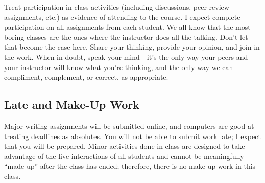 \documentclass[12pt,oneside]{amsart}	%
\begin{document}
Treat participation in class activities (including discussions, peer review assignments, etc.) as evidence of attending to the course. I expect complete participation on all assignments from each student. We all know that the most boring classes are the ones where the instructor does all the talking. Don't let that become the case here. Share your thinking, provide your opinion, and join in the work. When in doubt, speak your mind---it's the only way your peers and your instructor will know what you're thinking, and the only way we can compliment, complement, or correct, as appropriate.

\subsection{Late and Make-Up Work} %
\label{sub:late_and_make_up_work}
Major writing assignments will be submitted online, and computers are good at treating deadlines as absolutes. You will not be able to submit work late; I expect that you will be prepared. Minor activities done in class are designed to take advantage of the live interactions of all students and cannot be meaningfully ``made up'' after the class has ended; therefore, there is no make-up work in this class.
\end{document}
